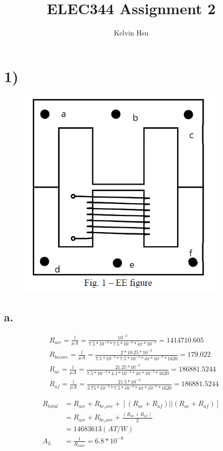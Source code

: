 \documentclass{article}
\title{ELEC344 Assignment 2}
\author{Kelvin Hsu}
\begin{document}
    \sffamily
   	\maketitle
    \newpage

\section*{1)}
    \begin{figure}[H]
        \centering
        \includegraphics[width=10cm]{figures/e-mag.PNG}
        \label{fig:e_mag}
    \end{figure}


    \subsection*{a.}
    \begin{align*}
        &R_{air} = \frac{l}{\mu A} = \frac{10^{-3}}{7.5*10^{-3}*7.5*10^{-3}*4\pi *10^{-7}} = 1414710.605\\
        &R_{be core} = \frac{l}{\mu A} = \frac{2* 10.25 *10^{-3}}{7.5*10^{-3}*7.5*10^{-3}*4\pi *10^{-7} * 1620} = 179.022\\
        &R_{ac} = \frac{l}{\mu A} = \frac{21.25* 10^{-3}}{7.5*10^{-3}*4.1*10^{-3}*4\pi *10^{-7} * 1620} = 186881.5244\\
        &R_{af} = \frac{l}{\mu A} = \frac{21.5 *10^{-3}}{3.75*10^{-3}*7.5*10^{-3}*4\pi *10^{-7} * 1620} = 186881.5244
    \end{align*}
    
    \begin{align*}
        R_{total} &= R_{air} + R_{be_core}  + [(R_{ac}+R_{af})||(R_{ac}+R_{af})]\\
        &= R_{air} + R_{be_core}  + \frac{(R_{ac}+R_{af})}{2}\\
        &= \boxed{14683613 (AT/W)}\\
        A_{L} &= \frac{1}{R_{total}} = 6.8*10^{-8}
    \end{align*}
\end{document}
